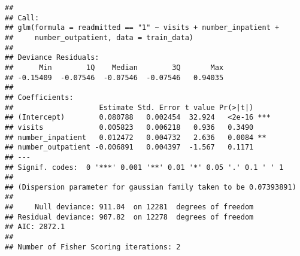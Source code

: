 \documentclass[
]{article}
\newenvironment{Shaded}{\begin{snugshade}}{\end{snugshade}}
\newcommand{\AttributeTok}[1]{\textcolor[rgb]{0.13,0.29,0.53}{#1}}
\newcommand{\CommentTok}[1]{\textcolor[rgb]{0.56,0.35,0.01}{\textit{#1}}}
\newcommand{\ConstantTok}[1]{\textcolor[rgb]{0.56,0.35,0.01}{#1}}
\newcommand{\DecValTok}[1]{\textcolor[rgb]{0.00,0.00,0.81}{#1}}
\newcommand{\FloatTok}[1]{\textcolor[rgb]{0.00,0.00,0.81}{#1}}
\newcommand{\FunctionTok}[1]{\textcolor[rgb]{0.13,0.29,0.53}{\textbf{#1}}}
\newcommand{\NormalTok}[1]{#1}
\newcommand{\OtherTok}[1]{\textcolor[rgb]{0.56,0.35,0.01}{#1}}
\newcommand{\SpecialCharTok}[1]{\textcolor[rgb]{0.81,0.36,0.00}{\textbf{#1}}}
\newcommand{\StringTok}[1]{\textcolor[rgb]{0.31,0.60,0.02}{#1}}
\begin{document}
\begin{Shaded}
\end{Shaded}

\begin{verbatim}
## 
## Call:
## glm(formula = readmitted == "1" ~ visits + number_inpatient + 
##     number_outpatient, data = train_data)
## 
## Deviance Residuals: 
##      Min        1Q    Median        3Q       Max  
## -0.15409  -0.07546  -0.07546  -0.07546   0.94035  
## 
## Coefficients:
##                    Estimate Std. Error t value Pr(>|t|)    
## (Intercept)        0.080788   0.002454  32.924   <2e-16 ***
## visits             0.005823   0.006218   0.936   0.3490    
## number_inpatient   0.012472   0.004732   2.636   0.0084 ** 
## number_outpatient -0.006891   0.004397  -1.567   0.1171    
## ---
## Signif. codes:  0 '***' 0.001 '**' 0.01 '*' 0.05 '.' 0.1 ' ' 1
## 
## (Dispersion parameter for gaussian family taken to be 0.07393891)
## 
##     Null deviance: 911.04  on 12281  degrees of freedom
## Residual deviance: 907.82  on 12278  degrees of freedom
## AIC: 2872.1
## 
## Number of Fisher Scoring iterations: 2
\end{verbatim}
\end{document}
